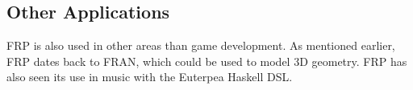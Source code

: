 \subsection{Other Applications}
\gls{FRP} is also used in other areas than game development. As mentioned earlier, \gls{FRP} dates back to FRAN, which could be used to model 3D geometry\cite{ElliottHudak97:Fran}. \gls{FRP} has also seen its use in music with the Euterpea Haskell \gls{DSL}\cite{euterpea}.